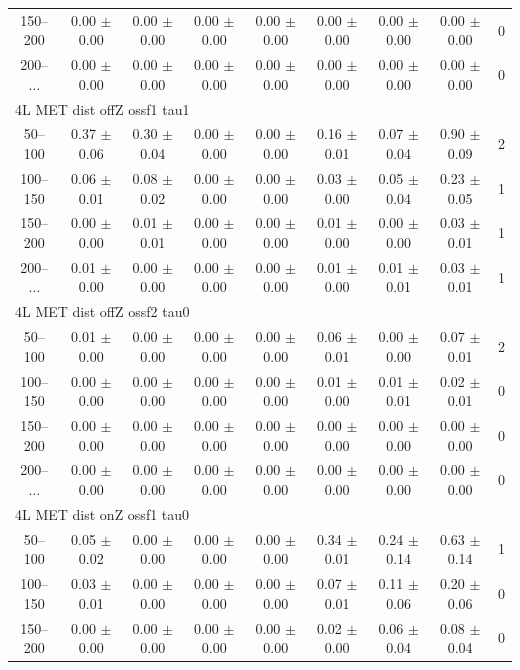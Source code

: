\begin{table}[htp]
\begin{center}
\begin{tabular}{|c|cccccc|c|c|}
150--200 & 0.00 $\pm$ 0.00 & 0.00 $\pm$ 0.00 & 0.00 $\pm$ 0.00 & 0.00 $\pm$ 0.00 & 0.00 $\pm$ 0.00 & 0.00 $\pm$ 0.00 & 0.00 $\pm$ 0.00 & 0 \\
200--$\dots$ & 0.00 $\pm$ 0.00 & 0.00 $\pm$ 0.00 & 0.00 $\pm$ 0.00 & 0.00 $\pm$ 0.00 & 0.00 $\pm$ 0.00 & 0.00 $\pm$ 0.00 & 0.00 $\pm$ 0.00 & 0 \\
\hline\hline
\multicolumn{9}{l}{4L MET dist offZ ossf1 tau1}\\\hline\hline
50--100 & 0.37 $\pm$ 0.06 & 0.30 $\pm$ 0.04 & 0.00 $\pm$ 0.00 & 0.00 $\pm$ 0.00 & 0.16 $\pm$ 0.01 & 0.07 $\pm$ 0.04 & 0.90 $\pm$ 0.09 & 2 \\
100--150 & 0.06 $\pm$ 0.01 & 0.08 $\pm$ 0.02 & 0.00 $\pm$ 0.00 & 0.00 $\pm$ 0.00 & 0.03 $\pm$ 0.00 & 0.05 $\pm$ 0.04 & 0.23 $\pm$ 0.05 & 1 \\
150--200 & 0.00 $\pm$ 0.00 & 0.01 $\pm$ 0.01 & 0.00 $\pm$ 0.00 & 0.00 $\pm$ 0.00 & 0.01 $\pm$ 0.00 & 0.00 $\pm$ 0.00 & 0.03 $\pm$ 0.01 & 1 \\
200--$\dots$ & 0.01 $\pm$ 0.00 & 0.00 $\pm$ 0.00 & 0.00 $\pm$ 0.00 & 0.00 $\pm$ 0.00 & 0.01 $\pm$ 0.00 & 0.01 $\pm$ 0.01 & 0.03 $\pm$ 0.01 & 1 \\
\hline\hline
\multicolumn{9}{l}{4L MET dist offZ ossf2 tau0}\\\hline\hline
50--100 & 0.01 $\pm$ 0.00 & 0.00 $\pm$ 0.00 & 0.00 $\pm$ 0.00 & 0.00 $\pm$ 0.00 & 0.06 $\pm$ 0.01 & 0.00 $\pm$ 0.00 & 0.07 $\pm$ 0.01 & 2 \\
100--150 & 0.00 $\pm$ 0.00 & 0.00 $\pm$ 0.00 & 0.00 $\pm$ 0.00 & 0.00 $\pm$ 0.00 & 0.01 $\pm$ 0.00 & 0.01 $\pm$ 0.01 & 0.02 $\pm$ 0.01 & 0 \\
150--200 & 0.00 $\pm$ 0.00 & 0.00 $\pm$ 0.00 & 0.00 $\pm$ 0.00 & 0.00 $\pm$ 0.00 & 0.00 $\pm$ 0.00 & 0.00 $\pm$ 0.00 & 0.00 $\pm$ 0.00 & 0 \\
200--$\dots$ & 0.00 $\pm$ 0.00 & 0.00 $\pm$ 0.00 & 0.00 $\pm$ 0.00 & 0.00 $\pm$ 0.00 & 0.00 $\pm$ 0.00 & 0.00 $\pm$ 0.00 & 0.00 $\pm$ 0.00 & 0 \\
\hline\hline
\multicolumn{9}{l}{4L MET dist onZ ossf1 tau0}\\\hline\hline
50--100 & 0.05 $\pm$ 0.02 & 0.00 $\pm$ 0.00 & 0.00 $\pm$ 0.00 & 0.00 $\pm$ 0.00 & 0.34 $\pm$ 0.01 & 0.24 $\pm$ 0.14 & 0.63 $\pm$ 0.14 & 1 \\
100--150 & 0.03 $\pm$ 0.01 & 0.00 $\pm$ 0.00 & 0.00 $\pm$ 0.00 & 0.00 $\pm$ 0.00 & 0.07 $\pm$ 0.01 & 0.11 $\pm$ 0.06 & 0.20 $\pm$ 0.06 & 0 \\
150--200 & 0.00 $\pm$ 0.00 & 0.00 $\pm$ 0.00 & 0.00 $\pm$ 0.00 & 0.00 $\pm$ 0.00 & 0.02 $\pm$ 0.00 & 0.06 $\pm$ 0.04 & 0.08 $\pm$ 0.04 & 0 \\

\end{tabular}
\end{center}
\end{table}

